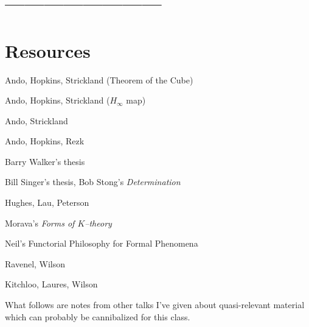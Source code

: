 \documentclass{amsart}
\newcommand{\<}{\langle}
\renewcommand{\>}{\rangle}
\numberwithin{equation}{section}
\theoremstyle{plain}
\theoremstyle{definition}
\theoremstyle{remark}
\begin{document}
\section{------------------------}



\section{Resources}

Ando, Hopkins, Strickland (Theorem of the Cube)

Ando, Hopkins, Strickland ($H_\infty$ map)

Ando, Strickland

Ando, Hopkins, Rezk

Barry Walker's thesis

Bill Singer's thesis, Bob Stong's \textit{Determination}

Hughes, Lau, Peterson

Morava's \textit{Forms of $K$--theory}

Neil's Functorial Philosophy for Formal Phenomena

Ravenel, Wilson

Kitchloo, Laures, Wilson




\newpage
\newpage
\newpage

\vspace{20\baselineskip}

\begin{center}
What follows are notes from other talks I've given about quasi-relevant material which can probably be cannibalized for this class.
\end{center}




\end{document}
